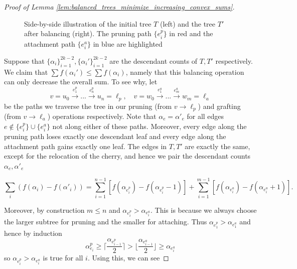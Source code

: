 \begin{subappendices}
\begin{proof}[Proof of Lemma \ref{lem:balanced_trees_minimize_increasing_convex_sums}]
\begin{figure}[h]
\begin{minipage}{0.48\textwidth}
\end{minipage}

\caption{Side-by-side illustration of the initial tree $T$ (left) and the tree $T'$ after balancing (right). The pruning path $\{e_i^p\}$ in red and the attachment path $\{e_i^a\}$ in blue are highlighted}
\label{fig:balancing_algorithm_trees}
\end{figure}


Suppose that $\{\alpha_i\}_{i=1}^{2k-2}, \{\alpha_i'\}_{i=1}^{2k-2}$ are the descendant counts of $T, T'$ respectively. We claim that $\sum f(\alpha_i') \leq \sum f(\alpha_i)$, namely that this balancing operation can only decrease the overall sum. To see why, let
%
\[v = u_0 \xrightarrow{e^p_1} ... \xrightarrow{e^p_n} u_n = \ell_p, \quad v = w_0 \xrightarrow{e^a_1} ... \xrightarrow{e^a_m} w_m = \ell_a\]
%
\noindent be the paths we traverse the tree in our pruning (from $v \to \ell_p$) and grafting (from $v \to \ell_a$) operations respectively. Note that $\alpha_e = \alpha'_e$ for all edges $e \notin \{e_i^p\} \cup \{e_i^a\}$ not along either of these paths. Moreover, every edge along the pruning path loses exactly one descendant leaf and every edge along the attachment path gains exactly one leaf.  The edges in $T,T'$ are exactly the same, except for the relocation of the cherry, and hence we pair the descendant counts $\alpha_e, \alpha'_e$

\[\sum_i (f(\alpha_i) - f(\alpha'_i))=  \sum_{i=1}^{n-1} [f(\alpha_{e_i^p}) -  f(\alpha_{e_i^p} - 1)] + \sum_{i=1}^{m-1} [f(\alpha_{e_i^a}) -  f(\alpha_{e_i^a} + 1)].\]

\noindent Moreover,  by construction $m \leq n$ and $\alpha_{e_i^p} > \alpha_{e_i^a}$. This is because we always choose the larger subtree for pruning and the smaller for attaching. Thus $\alpha_{e_1^p} > \alpha_{e_1^a}$ and hence by induction
%
\[\alpha_{e_i}^p \geq \bigg\lceil \frac{\alpha_{e_{i-1}^p}}{2} \bigg \rceil > \bigg\lfloor \frac{\alpha_{e_{i-1}^a}}{2} \bigg \rfloor \geq \alpha_{e_i^a}\]
%
\noindent so $\alpha_{e_i^p} > \alpha_{e_i^a}$ is true for all $i$. Using this, we can see


\end{proof}
\end{subappendices}
